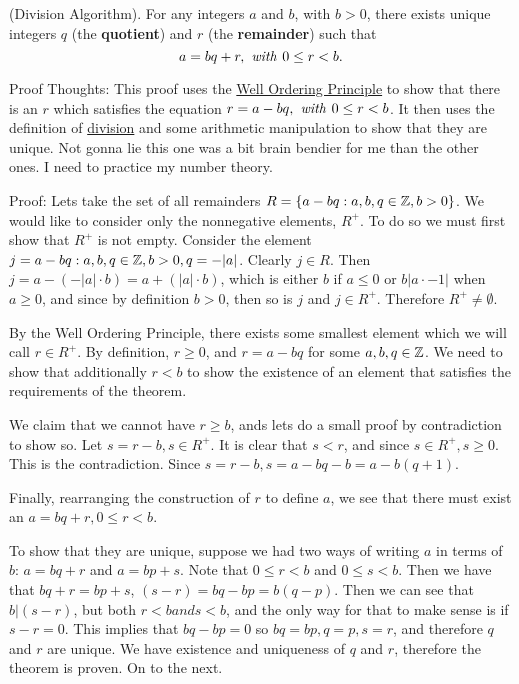  (Division Algorithm). For any integers \(a\) and \(b\), with \(b > 0\), there exists unique integers \(q\) (the \textbf{quotient}) and \(r\) (the \textbf{remainder}) such that \[a = bq + r, \text{\textit{ with }} 0 \leq r < b.\]

Proof Thoughts: This proof uses the \hyperref[def:1.1.2]{Well Ordering Principle} to show that there is an \(r\) which satisfies the equation \(r = a - bq, \text{\textit{ with }} 0 \leq r < b\). It then uses the definition of \hyperref[def:1.1.1]{division} and some arithmetic manipulation to show that they are unique. Not gonna lie this one was a bit brain bendier for me than the other ones. I need to practice my number theory.

Proof: Lets take the set of all remainders \(R = \{a - bq : a, b, q \in \mathbb{Z}, b > 0\}\). We would like to consider only the nonnegative elements, \(R^+\). To do so we must first show that \(R^+\) is not empty. Consider the element \(j = a - bq: a, b, q\in \mathbb{Z}, b > 0, q = -|a|\). Clearly \(j \in R\). Then \(j = a - (-|a| \cdot b) = a + (|a| \cdot b)\), which is either \(b\) if \(a \leq 0\) or \(b |a \cdot- 1|\) when \(a \geq 0\), and since by definition \( b > 0\), then so is \(j\) and \(j \in R^+\). Therefore \(R^+ \neq \emptyset\).

By the Well Ordering Principle, there exists some smallest element which we will call \(r \in R^+\). By definition, \(r \geq 0\), and \(r = a - bq\) for some \(a, b, q \in \mathbb{Z}\). We need to show that additionally \(r < b\) to show the existence of an element that satisfies the requirements of the theorem.

We claim that we cannot have \( r \geq b\), ands lets do a small proof by contradiction to show so. Let \(s = r - b, s \in R^+\). It is clear that \(s < r\), and since \(s \in R^+, s \geq 0\). This is the contradiction. Since \(s = r - b, s = a - bq - b = a - b(q + 1)\).

Finally, rearranging the construction of \(r\) to define \(a\), we see that there must exist an \(a = bq + r, 0 \leq r < b\).

To show that they are unique, suppose we had two ways of writing \(a\) in terms of \(b\): \(a = bq + r \) and \(a = bp + s\). Note that \(0 \leq r < b\) and \(0 \leq s < b\). Then we have that \(bq + r = bp + s\), \((s - r) = bq - bp = b(q-p)\). Then we can see that \(b|(s-r)\), but both \(r < b and s < b\), and the only way for that to make sense is if \(s - r = 0\). This implies that \(bq - bp = 0\) so \(bq = bp, q = p, s = r\), and therefore \(q\) and  \(r\) are unique. We have existence and uniqueness of \(q\) and  \(r\), therefore the theorem is proven. On to the next.

